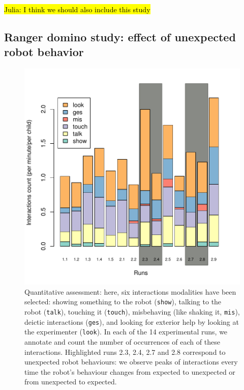 \documentclass{frontiersSCNS} %
\begin{document}
\hl{Julia: I think we should also include this study}



\subsection{Ranger domino study: effect of unexpected robot behavior}

\begin{figure}
    \centering
    \includegraphics[width=0.6\columnwidth]{ranger-interactions-per-runs}
    \caption{Quantitative assessment: here, six interactions modalities have
        been selected: showing something to the robot ({\tt show}), talking to
        the robot ({\tt talk}), touching it ({\tt touch}), misbehaving (like
        shaking it, {\tt mis}), deictic interactions ({\tt ges}), and looking
        for exterior help by looking at the experimenter ({\tt look}). In each
        of the 14 experimental runs, we annotate and count the number of
        occurrences of each of these interactions.  Highlighted runs 2.3, 2.4,
        2.7 and 2.8 correspond to unexpected robot behaviours: we observe peaks
        of interactions every time the robot's behaviour changes from expected to
        unexpected or from unexpected to expected.}

    \label{interactions-per-run}
\end{figure}
\end{document}
